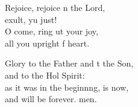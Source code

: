 \begin{psalmverse}
\begin{patverse}
Rejoice, rejoice \pointup{\i}n the Lord,\Med\\
exult, yu just!\\
O come, ring ut your joy,\Med\\
all you upright f heart.

Glory to the Father and t the Son,\Med\\
and to the Hol Spirit:\\
as it was in the beginn\pointup{\i}ng, is now,\Med\\
and will be forever. men. 
  \end{patverse}
\end{psalmverse}
